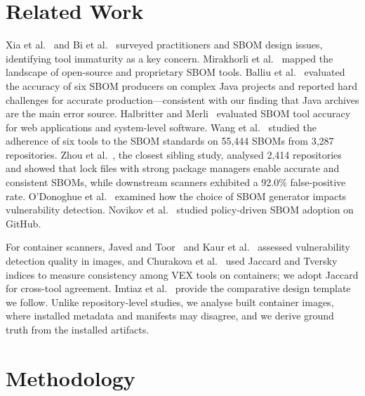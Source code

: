 \documentclass[conference]{IEEEtran}
\begin{document}
\section{Related Work}
Xia et al.~\cite{xia2023empirical} and Bi et al.~\cite{bi2023way} surveyed practitioners and SBOM
design issues, identifying tool immaturity as a key concern. Mirakhorli et al.~\cite{mirakhorli2024landscape}
mapped the landscape of open-source and proprietary SBOM tools. Balliu et al.~\cite{balliu2023java}
evaluated the accuracy of six SBOM producers on complex Java projects and reported hard challenges for
accurate production---consistent with our finding that Java archives are the main error source.
Halbritter and Merli~\cite{halbritter2024accuracy} evaluated SBOM tool accuracy for web applications and
system-level software. Wang et al.~\cite{wang2026adherence} studied the adherence of six tools to the SBOM
standards on 55,444 SBOMs from 3,287 repositories. Zhou et al.~\cite{zhou2025reality}, the closest
sibling study, analysed 2,414 repositories and showed that lock files with strong package managers enable
accurate and consistent SBOMs, while downstream scanners exhibited a 92.0\% false-positive rate.
O'Donoghue et al.~\cite{odonoghue2024impacts} examined how the choice of SBOM generator impacts vulnerability
detection. Novikov et al.~\cite{novikov2025policy} studied policy-driven SBOM adoption on GitHub.

For container scanners, Javed and Toor~\cite{javed2021container} and Kaur et al.~\cite{kaur2020container}
assessed vulnerability detection quality in images, and Churakova et al.~\cite{churakova2025vexed} used
Jaccard and Tversky indices to measure consistency among VEX tools on containers; we adopt Jaccard for
cross-tool agreement. Imtiaz et al.~\cite{imtiaz2021sca} provide the comparative design template we
follow. Unlike repository-level studies, we analyse built container images, where installed metadata
and manifests may disagree, and we derive ground truth from the installed artifacts.

\section{Methodology}
\end{document}
